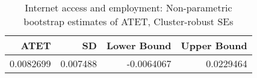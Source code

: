 \begin{table}[!h]
\centering
\caption{\label{tab:tab:np_atet_clustered}Internet access and employment: Non-parametric bootstrap estimates of ATET, Cluster-robust SEs}
\centering
\begin{tabular}[t]{rrrr}
\toprule
ATET & SD & Lower Bound & Upper Bound\\
\midrule
0.0082699 & 0.007488 & -0.0064067 & 0.0229464\\
\bottomrule
\end{tabular}
\end{table}
